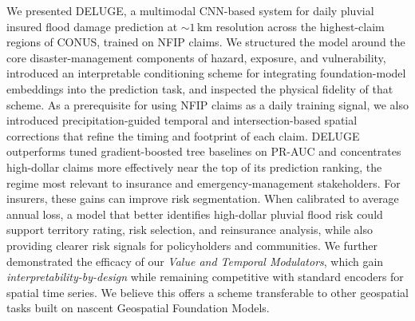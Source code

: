 We presented DELUGE, a multimodal CNN-based system for daily pluvial insured flood damage prediction at ${\sim}1$\,km resolution across the highest-claim regions of CONUS, trained on NFIP claims.
%
We structured the model around the core disaster-management components of hazard, exposure, and vulnerability, introduced an interpretable conditioning scheme for integrating foundation-model embeddings into the prediction task, and inspected the physical fidelity of that scheme.
%
As a prerequisite for using NFIP claims as a daily training signal, we also introduced precipitation-guided temporal and intersection-based spatial corrections that refine the timing and footprint of each claim.
%
DELUGE outperforms tuned gradient-boosted tree baselines on PR-AUC and concentrates high-dollar claims more effectively near the top of its prediction ranking, the regime most relevant to insurance and emergency-management stakeholders.
%
For insurers, these gains can improve risk segmentation. 
%
When calibrated to average annual loss, a model that better identifies high-dollar pluvial flood risk could support territory rating, risk selection, and reinsurance analysis, while also providing clearer risk signals for policyholders and communities.
%
We further demonstrated the efficacy of our \emph{Value and Temporal Modulators}, which gain \emph{interpretability-by-design} while remaining competitive with standard encoders for spatial time series. 
%
We believe this offers a scheme transferable to other geospatial tasks built on nascent Geospatial Foundation Models.
%


